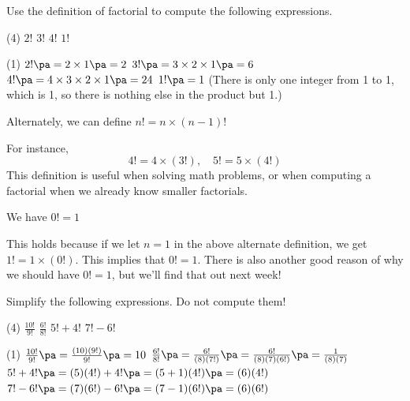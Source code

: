 \begin{frame}[t]
\begin{ex}
Use the definition of factorial to compute the following expressions.
\begin{tasks}(4)
\task $2!$
\task $3!$
\task $4!$
\task $1!$
\end{tasks}
\end{ex} \pa
\begin{sol}
\begin{tasks}(1)
\task $2! \pa = 2 \times 1 \pa = 2$ \pa
\task $3! \pa = 3 \times 2 \times 1 \pa = 6$\pa
\task $4! \pa = 4 \times 3 \times 2 \times 1 \pa = 24$ \pa
\task $1! \pa = 1$ (There is only one integer from 1 to 1, which is 1, so there is nothing else in the product but 1.)
\end{tasks}
\end{sol}
\end{frame}

\begin{frame}
\begin{cor}{}{}
Alternately, we can define $n! = n \times (n-1)!$ \pa
\end{cor} \pa
For instance,
\[ 4! = 4 \times (3!), \quad 5! = 5 \times (4!) \] \pa
This definition is useful when solving math problems, or when computing a factorial when we already know smaller factorials. \pa
\begin{cor}{}{}
We have $0! = 1$
\end{cor} \pa
This holds because if we let $n=1$ in the above alternate definition, we get $1! = 1 \times (0!)$. \pa This implies that $0! = 1$. \pa There is also another good reason of why we should have $0! = 1$, but we'll find that out next week!
\end{frame}


\begin{frame}[t]
\begin{ex}
Simplify the following expressions. Do not compute them!
\begin{tasks}(4)
\task $\frac{10!}{9!}$
\task $\frac{6!}{8!}$
\task $5! + 4!$
\task $7! - 6!$
\end{tasks}
\end{ex} \pa
\begin{sol}
\begin{tasks}(1)
\task $\frac{10!}{9!} \pa = \frac{(10)(9!)}{9!} \pa = 10$ \pa
\task $\frac{6!}{8!} \pa = \frac{6!}{(8)(7!)} \pa = \frac{6!}{(8)(7)(6!)} \pa = \frac{1}{(8)(7)}$ \pa
\task $5! + 4! \pa = (5)(4!) + 4! \pa = (5+1)(4!) \pa = (6)(4!)$ \pa
\task $7! - 6! \pa = (7)(6!) - 6! \pa = (7-1)(6!) \pa = (6)(6!)$
\end{tasks}
\end{sol}
\end{frame}



